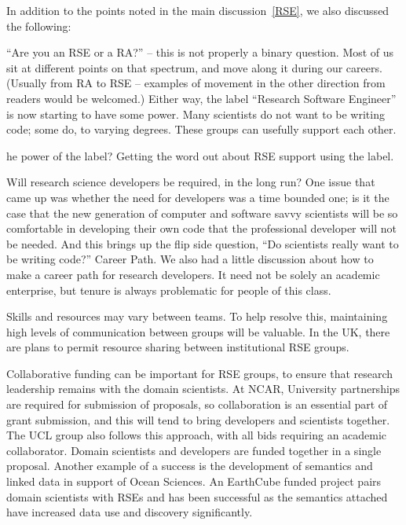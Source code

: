 In addition to the points noted in the main discussion~\ref{RSE}, we also
discussed the following:

``Are you an RSE or a RA?'' -- this is not properly a binary question. Most of
us sit at different points on that spectrum, and move along it during our
careers. (Usually from RA to RSE -- examples of movement in the other direction
from readers would be welcomed.)
Either way, the label ``Research Software Engineer'' is now starting to
have some power. Many scientists do not want to be writing code; some do, to
varying degrees. These groups can usefully support each other.


he power of the label? Getting the word out about RSE support using the label.


Will research science developers be required, in the long run?
One issue that came up was whether the need for developers was a time bounded one; is it the case that the new generation of computer and software savvy scientists will be so comfortable in developing their own code that the professional developer will not be needed.  And this brings up the flip side question, “Do scientists really want to be writing code?”
Career Path.
We also had a little discussion about how to make a career path for research developers. It need not be solely an academic enterprise, but tenure is always problematic for people of this class.

Skills and resources may vary between teams. To help resolve this, maintaining
high levels of communication between groups will be valuable. In the UK, there
are plans to permit resource sharing between institutional RSE groups.

Collaborative funding can be important for RSE groups, to ensure that research
leadership remains with the domain scientists. At NCAR, University partnerships
are required for submission of proposals, so collaboration is an essential part
of grant submission, and this will tend to bring developers and
scientists together. The UCL group also follows this approach, with all bids
requiring an academic collaborator.
Domain scientists and developers are funded together in a single proposal.
Another example of a success is the development of semantics and linked data in
support of Ocean Sciences. An EarthCube funded project pairs domain scientists
with RSEs and has been successful as the semantics attached have increased data
use and discovery significantly.

